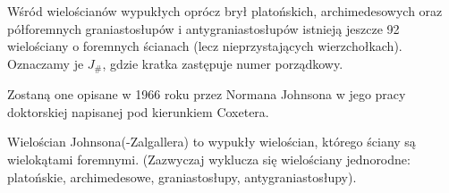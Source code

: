 %

Wśród wielościanów wypukłych oprócz brył platońskich, archimedesowych oraz półforemnych graniastosłupów i antygraniastosłupów istnieją jeszcze 92 wielościany o foremnych ścianach (lecz nieprzystających wierzchołkach).
Oznaczamy je $J_{\#}$, gdzie kratka zastępuje numer porządkowy.



Zostaną one opisane w 1966 roku przez Normana Johnsona w jego pracy doktorskiej napisanej pod kierunkiem Coxetera.


Wielościan Johnsona(-Zalgallera) to wypukły wielościan, którego ściany są wielokątami foremnymi. (Zazwyczaj wyklucza się wielościany jednorodne: platońskie, archimedesowe, graniastosłupy, antygraniastosłupy).



%